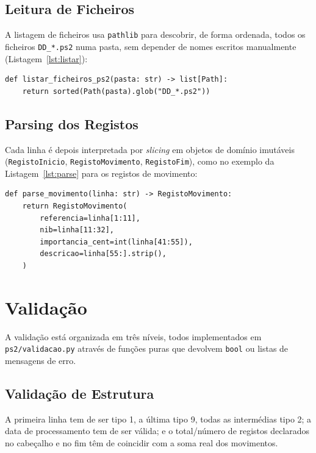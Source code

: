 \documentclass[11pt,a4paper]{report}
\begin{document}
\section{Leitura de Ficheiros}

A listagem de ficheiros usa \texttt{pathlib}\cite{pythondocs} para descobrir,
de forma ordenada, todos os ficheiros \texttt{DD\_*.ps2} numa pasta, sem
depender de nomes escritos manualmente (Listagem~\ref{lst:listar}):

\begin{lstlisting}[caption={Listagem de ficheiros PS2 (\texttt{ps2/leitura.py})},label=lst:listar]
def listar_ficheiros_ps2(pasta: str) -> list[Path]:
    return sorted(Path(pasta).glob("DD_*.ps2"))
\end{lstlisting}

\section{Parsing dos Registos}

Cada linha é depois interpretada por \textit{slicing} em objetos de domínio
imutáveis (\texttt{RegistoInicio}, \texttt{RegistoMovimento},
\texttt{RegistoFim}), como no exemplo da Listagem~\ref{lst:parse} para os
registos de movimento:

\begin{lstlisting}[caption={Parsing de um registo de movimento (\texttt{ps2/parsing.py})},label=lst:parse]
def parse_movimento(linha: str) -> RegistoMovimento:
    return RegistoMovimento(
        referencia=linha[1:11],
        nib=linha[11:32],
        importancia_cent=int(linha[41:55]),
        descricao=linha[55:].strip(),
    )
\end{lstlisting}

\chapter{Validação}
\label{chap:validacao}

A validação está organizada em três níveis, todos implementados em
\texttt{ps2/validacao.py} através de funções puras que devolvem
\texttt{bool} ou listas de mensagens de erro.

\section{Validação de Estrutura}

A primeira linha tem de ser tipo 1, a última tipo 9, todas as intermédias
tipo 2; a data de processamento tem de ser válida; e o total/número de
registos declarados no cabeçalho e no fim têm de coincidir com a soma real
dos movimentos.
\end{document}

